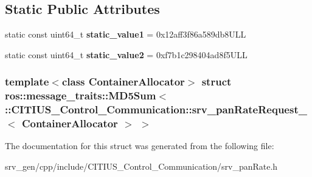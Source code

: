 \subsection*{\-Static \-Public \-Attributes}
\begin{DoxyCompactItemize}
\item 
\hypertarget{structros_1_1message__traits_1_1_m_d5_sum_3_01_1_1_c_i_t_i_u_s___control___communication_1_1srv_f466bd661e7ee9197b4b7130bd97524a_a9ee2f0538898386e503987e4a5d7f014}{static const uint64\-\_\-t {\bfseries static\-\_\-value1} = 0x12aff3f86a589db8\-U\-L\-L}\label{structros_1_1message__traits_1_1_m_d5_sum_3_01_1_1_c_i_t_i_u_s___control___communication_1_1srv_f466bd661e7ee9197b4b7130bd97524a_a9ee2f0538898386e503987e4a5d7f014}

\item 
\hypertarget{structros_1_1message__traits_1_1_m_d5_sum_3_01_1_1_c_i_t_i_u_s___control___communication_1_1srv_f466bd661e7ee9197b4b7130bd97524a_a920ccf3c675b5a69211cd0cbdcb05b5b}{static const uint64\-\_\-t {\bfseries static\-\_\-value2} = 0xf7b1c298404ad8f5\-U\-L\-L}\label{structros_1_1message__traits_1_1_m_d5_sum_3_01_1_1_c_i_t_i_u_s___control___communication_1_1srv_f466bd661e7ee9197b4b7130bd97524a_a920ccf3c675b5a69211cd0cbdcb05b5b}

\end{DoxyCompactItemize}
\subsubsection*{template$<$class Container\-Allocator$>$ struct ros\-::message\-\_\-traits\-::\-M\-D5\-Sum$<$ \-::\-C\-I\-T\-I\-U\-S\-\_\-\-Control\-\_\-\-Communication\-::srv\-\_\-pan\-Rate\-Request\-\_\-$<$ Container\-Allocator $>$ $>$}



\-The documentation for this struct was generated from the following file\-:\begin{DoxyCompactItemize}
\item 
srv\-\_\-gen/cpp/include/\-C\-I\-T\-I\-U\-S\-\_\-\-Control\-\_\-\-Communication/srv\-\_\-pan\-Rate.\-h\end{DoxyCompactItemize}
